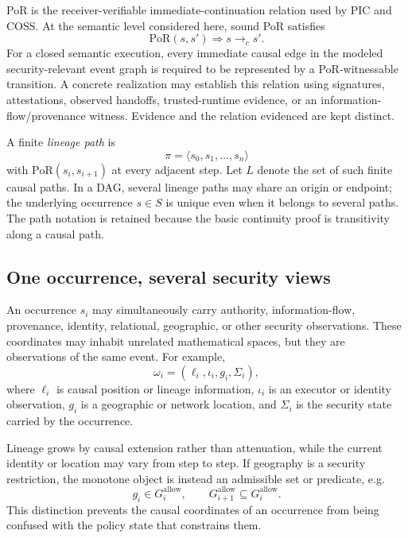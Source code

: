 \documentclass[10pt,twocolumn]{article}
\newcommand{\Model}{\textnormal{\textsc{COSS}}\xspace}
\newcommand{\PoR}{\mathrm{PoR}}
\newcommand{\state}{\Sigma}
\begin{document}
PoR is the receiver-verifiable immediate-continuation relation used by PIC and
\Model. At the semantic level considered here, sound PoR satisfies
\begin{equation}
  \PoR(s,s')\Longrightarrow s\to_c s'.
  \label{eq:por-sound}
\end{equation}
For a closed semantic execution, every immediate causal edge in the modeled
security-relevant event graph is required to be represented by a PoR-witnessable
transition. A concrete realization may establish this relation using signatures,
attestations, observed handoffs, trusted-runtime evidence, or an
information-flow/provenance witness. Evidence and the relation evidenced are
kept distinct.

A finite \emph{lineage path} is
\begin{equation}
  \pi=\langle s_0,s_1,\ldots,s_n\rangle
\end{equation}
with $\PoR(s_i,s_{i+1})$ at every adjacent step. Let $L$ denote the set of
such finite causal paths. In a DAG, several lineage paths may share an origin
or endpoint; the underlying occurrence $s\in S$ is unique even when it belongs
to several paths. The path notation is retained because the basic continuity
proof is transitivity along a causal path.

\subsection{One occurrence, several security views}

An occurrence $s_i$ may simultaneously carry authority, information-flow,
provenance, identity, relational, geographic, or other security observations.
These coordinates may inhabit unrelated mathematical spaces, but they are
observations of the same event. For example,
\begin{equation}
  \omega_i=(\ell_i,\iota_i,g_i,\state_i),
\end{equation}
where $\ell_i$ is causal position or lineage information, $\iota_i$ is an
executor or identity observation, $g_i$ is a geographic or network location,
and $\state_i$ is the security state carried by the occurrence.

Lineage grows by causal extension rather than attenuation, while the current
identity or location may vary from step to step. If geography is a security
restriction, the monotone object is instead an admissible set or predicate, e.g.
\begin{equation}
  g_i\in G_i^{\mathrm{allow}},
  \qquad
  G_{i+1}^{\mathrm{allow}}\subseteq G_i^{\mathrm{allow}}.
\end{equation}
This distinction prevents the causal coordinates of an occurrence from being
confused with the policy state that constrains them.
\end{document}
